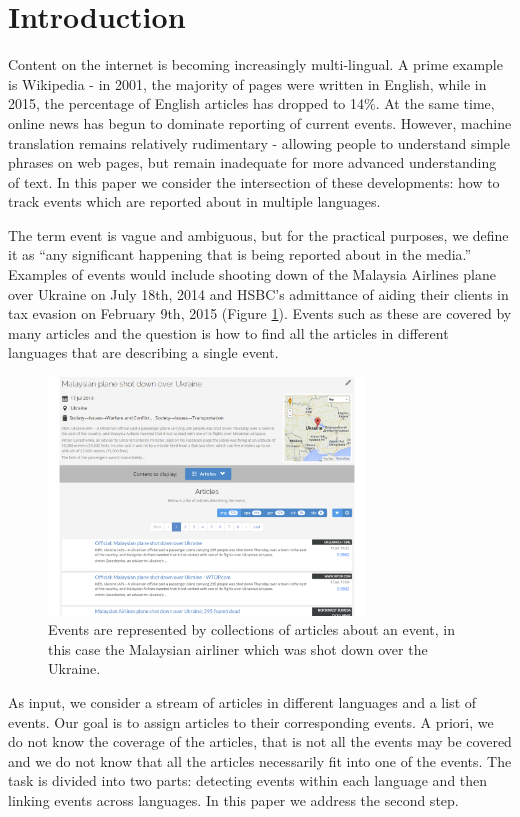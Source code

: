 \documentclass[twoside,11pt]{article}
\begin{document}
\section{Introduction}

Content on the internet is becoming increasingly multi-lingual. A prime example is Wikipedia - in 2001, the majority of pages were written in English, while in 2015, the percentage of English articles has dropped to 14\%. At the same time, online news has begun to dominate reporting of current events. However, machine translation remains relatively rudimentary - allowing people to understand simple phrases on web pages, but remain inadequate for more advanced understanding of text. In this paper we consider the intersection of these developments: how to track events which are reported about in multiple languages.

The term event is vague and ambiguous, but for the practical purposes, we define it as ``any significant happening that is being reported about in the media.'' Examples of events would include shooting down of the Malaysia Airlines plane over Ukraine on July 18th, 2014 and HSBC's admittance of aiding their clients in tax evasion on February 9th, 2015 (Figure \ref{fig:event2}). Events such as these are covered by many articles and the question is how to find all the articles in different languages that are describing a single event.

\begin{figure}
\centering
\includegraphics[width=0.75\textwidth]{events2.png}
\caption{\label{fig:event2} Events are represented by collections of articles about an event, in this case the Malaysian airliner which was shot down over the Ukraine.}
\end{figure}

As input, we consider a stream of articles in different languages and a list of events. Our goal is to assign articles to their corresponding events. A priori, we do not know the coverage of the articles, that is not all the events may be covered and we do not know that all the articles necessarily fit into one of the events. The task is divided into two parts: detecting events within each language and then linking events across languages. In this paper we address the second step.
\end{document}
